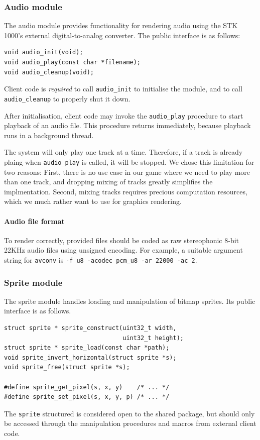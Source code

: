 \documentclass[a4paper,10pt]{article}
\newcommand{\isrc}[1]{\texttt{#1}}
\begin{document}
\subsubsection{Audio module}
The audio module provides functionality for rendering audio using the
STK 1000's external digital-to-analog converter.  The public interface is as
follows:
\begin{lstlisting}
void audio_init(void);
void audio_play(const char *filename);
void audio_cleanup(void);
\end{lstlisting}
Client code is \emph{required} to call \isrc{audio\_init} to initialise
the module, and to call \isrc{audio\_cleanup} to properly shut it down.

After initialisation, client code may invoke the \isrc{audio\_play} procedure
to start playback of an audio file. This procedure returns immediately,
because playback runs in a background thread.

The system will only play one track at a time. Therefore, if a track is
already plaing when \isrc{audio\_play} is called, it will be stopped.  We
chose this limitation for two reasons: First, there is no use case in our game
where we need to play more than one track, and dropping mixing of tracks
greatly simplifies the implmentation. Second, mixing tracks requires precious
computation resources, which we much rather want to use for graphics
rendering.

\paragraph{Audio file format}
To render correctly, provided files
should be coded as raw stereophonic 8-bit 22KHz audio files using unsigned
encoding. For example, a suitable argument string for \isrc{avconv} is
\isrc{-f u8 -acodec pcm\_u8 -ar 22000 -ac 2}.

\clearpage

\subsubsection{Sprite module}
The sprite module handles loading and manipulation of bitmap sprites.
Its public interface is as follows.
\begin{lstlisting}
struct sprite * sprite_construct(uint32_t width, 
                                 uint32_t height);
struct sprite * sprite_load(const char *path);
void sprite_invert_horizontal(struct sprite *s);
void sprite_free(struct sprite *s);

#define sprite_get_pixel(s, x, y)    /* ... */
#define sprite_set_pixel(s, x, y, p) /* ... */
\end{lstlisting}
The \isrc{sprite} structured is considered open to the \textsf{shared}
package, but should only be accessed through the manipulation procedures and
macros from external client code.
\end{document}
